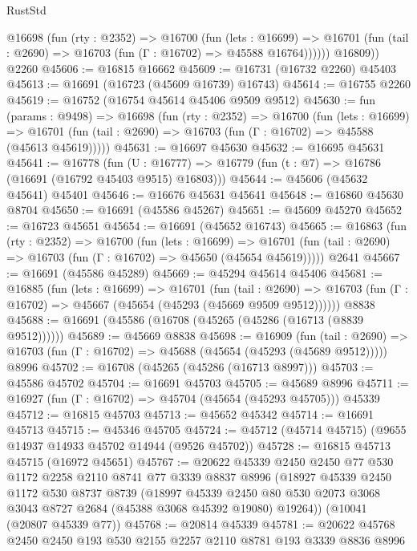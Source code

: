 \begin{lexlean}{RustStd}
\begin{coremodule}
          @16698
            (fun (rty : @2352) =>
            @16700
              (fun (lets : @16699) =>
              @16701 (fun (tail : @2690) => @16703 (fun (Γ : @16702) => @45588 @16764))))))
        @16809))
    @2260
@45606 := @16815 @16662
@45609 := @16731 (@16732 @2260) @45403
@45613 := @16691 (@16723 (@45609 @16739) @16743)
@45614 := @16755 @2260
@45619 := @16752 (@16754 @45614 @45406 @9509 @9512)
@45630 := fun (params : @9498) =>
  @16698
    (fun (rty : @2352) =>
    @16700
      (fun (lets : @16699) =>
      @16701 (fun (tail : @2690) => @16703 (fun (Γ : @16702) => @45588 (@45613 @45619)))))
@45631 := @16697 @45630
@45632 := @16695 @45631
@45641 := @16778
    (fun (U : @16777) => @16779 (fun (t : @7) => @16786 (@16691 (@16792 @45403 @9515) @16803)))
@45644 := @45606 (@45632 @45641) @45401
@45646 := @16676 @45631 @45641
@45648 := @16860 @45630 @8704
@45650 := @16691 (@45586 @45267)
@45651 := @45609 @45270
@45652 := @16723 @45651
@45654 := @16691 (@45652 @16743)
@45665 := @16863
    (fun (rty : @2352) =>
    @16700
      (fun (lets : @16699) =>
      @16701 (fun (tail : @2690) => @16703 (fun (Γ : @16702) => @45650 (@45654 @45619)))))
    @2641
@45667 := @16691 (@45586 @45289)
@45669 := @45294 @45614 @45406
@45681 := @16885
    (fun (lets : @16699) =>
    @16701
      (fun (tail : @2690) =>
      @16703 (fun (Γ : @16702) => @45667 (@45654 (@45293 (@45669 @9509 @9512))))))
    @8838
@45688 := @16691 (@45586 (@16708 (@45265 (@45286 (@16713 (@8839 @9512))))))
@45689 := @45669 @8838
@45698 := @16909
    (fun (tail : @2690) => @16703 (fun (Γ : @16702) => @45688 (@45654 (@45293 (@45689 @9512)))))
    @8996
@45702 := @16708 (@45265 (@45286 (@16713 @8997)))
@45703 := @45586 @45702
@45704 := @16691 @45703
@45705 := @45689 @8996
@45711 := @16927 (fun (Γ : @16702) => @45704 (@45654 (@45293 @45705))) @45339
@45712 := @16815 @45703
@45713 := @45652 @45342
@45714 := @16691 @45713
@45715 := @45346 @45705
@45724 := @45712 (@45714 @45715) (@9655 @14937 @14933 @45702 @14944 (@9526 @45702))
@45728 := @16815 @45713 @45715 (@16972 @45651)
@45767 := @20622
    @45339
    @2450
    @2450
    @77
    @530
    @1172
    @2258
    @2110
    @8741
    @77
    @3339
    @8837
    @8996
    (@18927
      @45339
      @2450
      @1172
      @530
      @8737
      @8739
      (@18997
        @45339
        @2450
        @80
        @530
        @2073
        @3068
        @3043
        @8727
        @2684
        (@45388 @3068 @45392 @19080)
        @19264))
    (@10041 (@20807 @45339 @77))
@45768 := @20814 @45339
@45781 := @20622 @45768 @2450 @2450 @193 @530 @2155 @2257 @2110 @8781 @193 @3339 @8836 @8996

\end{coremodule}
\end{lexlean}

